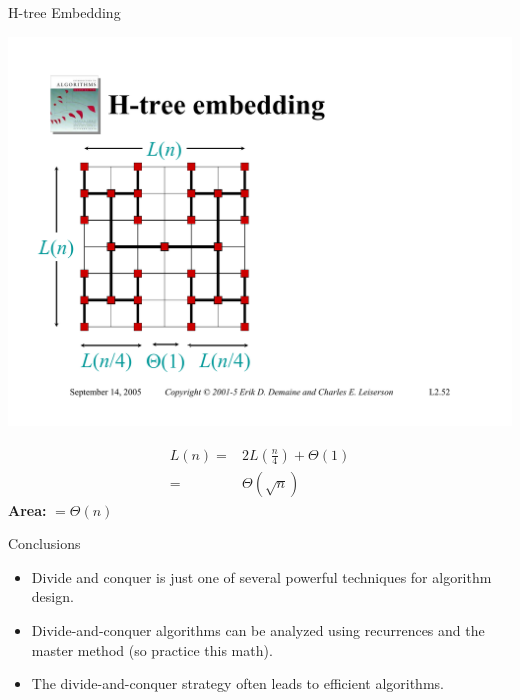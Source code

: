 \documentclass{beamer}
\begin{document}
\begin{frame}{H-tree Embedding}
    \begin{minipage}{0.48\textwidth}
        \centering
        \includegraphics[width=\textwidth, trim={0.45cm 1.75cm 13.25cm 4.25cm}, clip]{pages/lec3_52}
    \end{minipage}
    \hfill
    \begin{minipage}{0.48\textwidth}
        \pause
        \centering
        \begin{equation*}
            \begin{split}
                L(n) =& 2L\left(\frac{n}{4} \right) + \Theta(1) \\
                     =& \Theta(\sqrt{n})
            \end{split}
        \end{equation*}
        \pause
        \Large
        \textbf{Area:} $ = \Theta(n)$
    \end{minipage}
\end{frame}

\begin{frame}{Conclusions}
    \begin{itemize}
        \item Divide and conquer is just one of several powerful techniques for algorithm design.
        \item Divide-and-conquer algorithms can be analyzed using recurrences and the master method (so practice this math).
        \item The divide-and-conquer strategy often leads to efficient algorithms.
    \end{itemize}
\end{frame}
\end{document}
